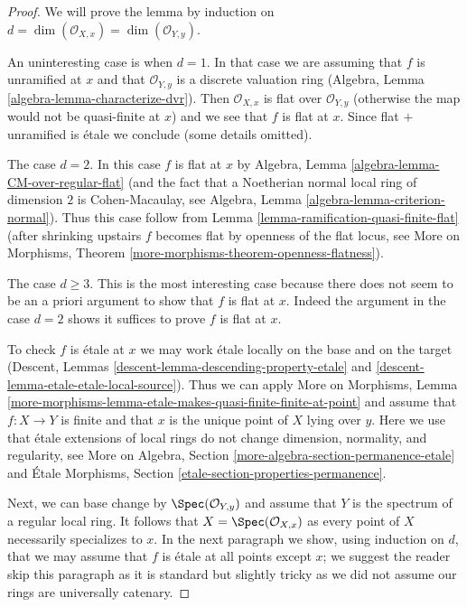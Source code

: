 \begin{proof}
We will prove the lemma by induction on
$d = \dim(\mathcal{O}_{X, x}) = \dim(\mathcal{O}_{Y, y})$.

\medskip\noindent
An uninteresting case is when $d = 1$.
In that case we are assuming that $f$ is unramified at $x$
and that $\mathcal{O}_{Y, y}$ is a discrete valuation ring
(Algebra, Lemma \ref{algebra-lemma-characterize-dvr}).
Then $\mathcal{O}_{X, x}$ is flat over $\mathcal{O}_{Y, y}$
(otherwise the map would not be quasi-finite at $x$)
and we see that $f$ is flat at $x$. Since flat $+$
unramified is \'etale we conclude (some details omitted).

\medskip\noindent
The case $d = 2$. In this case $f$ is flat at $x$ by
Algebra, Lemma \ref{algebra-lemma-CM-over-regular-flat}
(and the fact that a Noetherian normal local ring of
dimension $2$ is Cohen-Macaulay, see
Algebra, Lemma \ref{algebra-lemma-criterion-normal}).
Thus this case follow from
Lemma \ref{lemma-ramification-quasi-finite-flat}
(after shrinking upstairs $f$ becomes flat by
openness of the flat locus, see
More on Morphisms, Theorem \ref{more-morphisms-theorem-openness-flatness}).

\medskip\noindent
The case $d \geq 3$. This is the most interesting case because there does not
seem to be an a priori argument to show that $f$ is flat at $x$. Indeed
the argument in the case $d = 2$ shows it suffices to prove $f$ is flat at $x$.

\medskip\noindent
To check $f$ is \'etale at $x$ we may work \'etale locally on the base and
on the target
(Descent, Lemmas \ref{descent-lemma-descending-property-etale} and
\ref{descent-lemma-etale-etale-local-source}).
Thus we can apply More on Morphisms, Lemma
\ref{more-morphisms-lemma-etale-makes-quasi-finite-finite-at-point}
and assume that $f : X \to Y$ is finite and that $x$ is the unique
point of $X$ lying over $y$. Here we use that \'etale extensions of
local rings do not change dimension, normality, and regularity, see
More on Algebra, Section \ref{more-algebra-section-permanence-etale}
and
\'Etale Morphisms, Section \ref{etale-section-properties-permanence}.

\medskip\noindent
Next, we can base change by $\Spec(\mathcal{O}_{Y, y})$
and assume that $Y$ is the spectrum of a regular local ring.
It follows that $X = \Spec(\mathcal{O}_{X, x})$ as
every point of $X$ necessarily specializes to $x$.
In the next paragraph we show, using induction on $d$, that
we may assume that $f$ is \'etale at all points except $x$;
we suggest the reader skip this paragraph as it is standard
but slightly tricky as we did not assume our rings are
universally catenary.


\end{proof}
